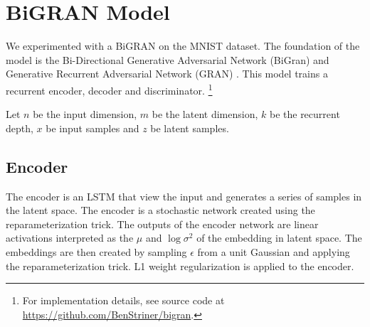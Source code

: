 \documentclass{article}
\begin{document}

 


\section{BiGRAN Model}
 
We experimented with a BiGRAN on the MNIST dataset. The foundation of the model is the Bi-Directional Generative Adversarial Network (BiGran) \cite{Donahue2016} and Generative Recurrent Adversarial Network  (GRAN) \cite{Im2016}. This model trains a recurrent encoder, decoder and discriminator. \footnote{For implementation details, see source code at \url{https://github.com/BenStriner/bigran}.}
 
Let $n$ be the input dimension,  $m$ be the latent dimension, $k$ be the recurrent depth, $x$ be input samples and $z$ be latent samples.
 
 \subsection{Encoder}
 
 The encoder is an LSTM that view the input and generates a series of samples in the latent space. The encoder is a stochastic network created using the reparameterization trick. The outputs of the encoder network are linear activations interpreted as the $\mu$ and $\log \sigma^2$ of the embedding in latent space. The embeddings are then created by sampling $\epsilon$ from a unit Gaussian and applying the reparameterization trick. L1 weight regularization is applied to the encoder.
 
\end{document}
